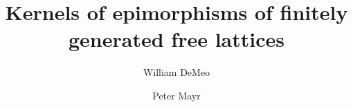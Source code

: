 \newcommand\alg[1]{\ensuremath{\mathbf{#1}}}

\usepackage[yyyymmdd,hhmmss]{datetime}
\usepackage{background}


\usepackage{pdfcomment}
\usepackage{color}
\usepackage{amsmath}
\usepackage{amssymb}
\usepackage{amsfonts}
\usepackage{mathtools}
\usepackage{amscd}
\usepackage{inputs/wjdlatexmacs}

\usepackage[mathcal]{euscript}
\usepackage{comment}
\usepackage{tikz}
\usetikzlibrary{math} %

\renewcommand{\th}[2]{#1\mathrel{\theta}#2}
\newcommand{\infixrel}[3]{#2\mathrel{#1}#3}
\newcommand\llb{\ensuremath{\llbracket}}
\newcommand\rrb{\ensuremath{\rrbracket}}

\theoremstyle{plain}
\newtheorem{theorem}{Theorem}[section]
\newtheorem{lemma}[theorem]{Lemma}
\newtheorem{proposition}[theorem]{Proposition}
\newtheorem{prop}[theorem]{Prop.}
\theoremstyle{definition}
\newtheorem{conjecture}{Conjecture}
\newtheorem{claim}[theorem]{Claim}
\newtheorem{subclaim}{Subclaim}
\newtheorem{corollary}[theorem]{Corollary}
\newtheorem{definition}[theorem]{Definition}
\newtheorem{notation}[theorem]{Notation}
\newtheorem{Fact}[theorem]{Fact}
\newtheorem*{fact}{Fact}
\newtheorem{example}[theorem]{Example}
\newtheorem{examples}[theorem]{Examples}
\newtheorem{exercise}{Exercise}
\newtheorem*{lem}{Lemma}
\newtheorem*{cor}{Corollary}
\newtheorem*{remark}{Remark}
\newtheorem*{remarks}{Remarks}
\newtheorem*{obs}{Observation}

\title[Kernels of Lattice Epimorphisms]{Kernels of epimorphisms of finitely generated free lattices}
\author[W.~DeMeo]{William DeMeo}

\author[P.~Mayr]{Peter Mayr}

